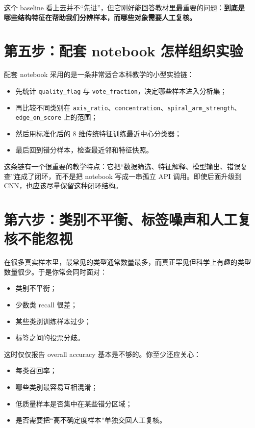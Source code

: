 这个 baseline 看上去并不“先进”，但它刚好能回答教材里最重要的问题：\textbf{到底是哪些结构特征在帮助我们分辨样本，而哪些对象需要人工复核。}

\section{第五步：配套 notebook 怎样组织实验}

配套 notebook 采用的是一条非常适合本科教学的小型实验链：

\begin{itemize}
    \item 先统计 \texttt{quality\_flag} 与 \texttt{vote\_fraction}，决定哪些样本进入分析集；
    \item 再比较不同类别在 \texttt{axis\_ratio}、\texttt{concentration}、\texttt{spiral\_arm\_strength}、\texttt{edge\_on\_score} 上的范围；
    \item 然后用标准化后的 8 维传统特征训练最近中心分类器；
    \item 最后回到错分样本，检查最近邻和特征快照。
\end{itemize}

这条链有一个很重要的教学特点：它把“数据筛选、特征解释、模型输出、错误复查”连成了闭环，而不是把 notebook 写成一串孤立 API 调用。即使后面升级到 CNN，也应该尽量保留这种闭环结构。

\section{第六步：类别不平衡、标签噪声和人工复核不能忽视}

在很多真实样本里，最常见的类型通常数量最多，而真正罕见但科学上有趣的类型数量很少。于是你常会同时面对：

\begin{itemize}
    \item 类别不平衡；
    \item 少数类 recall 很差；
    \item 某些类别训练样本过少；
    \item 标签之间的投票分歧。
\end{itemize}

这时仅仅报告 overall accuracy 基本是不够的。你至少还应关心：

\begin{itemize}
    \item 每类召回率；
    \item 哪些类别最容易互相混淆；
    \item 低质量样本是否集中在某些错分区域；
    \item 是否需要把“高不确定度样本”单独交回人工复核。
\end{itemize}

